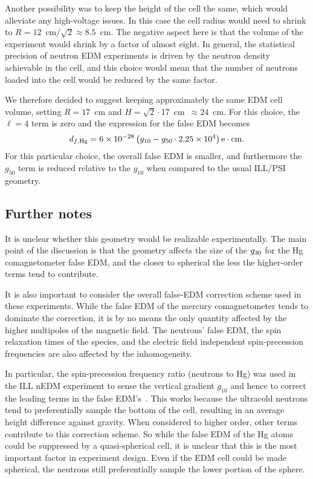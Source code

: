 \documentclass[preprint,12pt]{elsarticle}
\begin{document}
Another possibility was to keep the height of the cell the same, which
would alleviate any high-voltage issues.  In this case the cell radius
would need to shrink to $R=12$~cm$/\sqrt{2}\approx 8.5$~cm.  The
negative aspect here is that the volume of the experiment would shrink
by a factor of almost eight.  In general, the statistical precision of
neutron EDM experiments is driven by the neutron density achievable in
the cell, and this choice would mean that the number of neutrons
loaded into the cell would be reduced by the same factor.

We therefore decided to suggest keeping approximately the same EDM
cell volume, setting $R=17$~cm and $H=\sqrt{2}\cdot$17~cm~$\approx
24$~cm.  For this choice, the $\ell=4$ term is zero and the expression
for the false EDM becomes
\begin{equation}
d_{f,\rm Hg} = \num{6e-28}\left(g_{10} - g_{50}\cdot\num{2.25e4}\right)\mathrm{e}\cdot\mathrm{cm}.
\end{equation}
For this particular choice, the overall false EDM is smaller, and
furthermore the $g_{50}$ term is reduced relative to the $g_{10}$ when
compared to the usual ILL/PSI geometry.


\subsection{Further notes}

It is unclear whether this geometry would be realizable
experimentally.  The main point of the discussion is that the geometry
affects the size of the $g_{\rm 30}$ for the Hg comagnetometer false
EDM, and the closer to spherical the less the higher-order terms tend
to contribute.

It is also important to consider the overall false-EDM correction
scheme used in these experiments.  While the false EDM of the mercury
comagnetometer tends to dominate the correction, it is by no means the
only quantity affected by the higher multipoles of the magnetic field.
The neutrons' false EDM, the spin relaxation times of the species, and
the electric field independent spin-precession frequencies are also
affected by the inhomogeneity.

In particular, the spin-precession frequency ratio (neutrons to Hg)
was used in the ILL nEDM experiment to sense the vertical gradient
$g_{10}$ and hence to correct the leading terms in the false
EDM's~\cite{bib:baker,bib:pendlebury}.  This works because the
ultracold neutrons tend to preferentially sample the bottom of the
cell, resulting in an average height difference against gravity.  When
considered to higher order, other terms contribute to this correction
scheme.  So while the false EDM of the Hg atoms could be suppressed by
a quasi-spherical cell, it is unclear that this is the most important
factor in experiment design.  Even if the EDM cell could be made
spherical, the neutrons still preferentially sample the lower portion
of the sphere.
\end{document}
